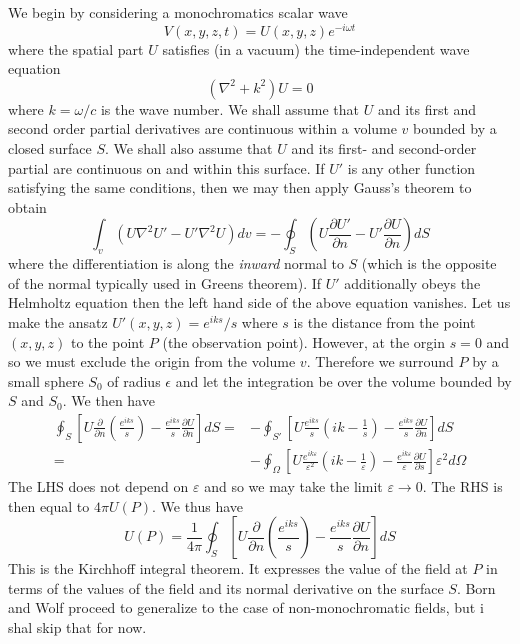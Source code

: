\documentclass[../../main.tex]{subfiles} %
\begin{document}
We begin by considering a monochromatics scalar wave 
\begin{equation}
    V(x,y,z,t)=U(x,y,z)e^{-i\omega t}
\end{equation}
where the spatial part $U$ satisfies (in a vacuum) the time-independent wave equation
\begin{equation}\label{eq. Helmholtz equation}
    (\nabla^2+k^2)U=0
\end{equation}
where $k=\omega/c$ is the wave number. We shall assume that $U$ and its first and second order partial derivatives are continuous within a volume $v$ bounded by a closed surface $S$. We shall also assume that $U$ and its first- and second-order partial are continuous on and within this surface. If $U'$ is any other function satisfying the same conditions, then we may then apply Gauss's theorem to obtain 
\begin{equation}
    \int_v (U\nabla^2U'-U'\nabla^2U)dv=-\oint_S \left(U\frac{\partial U'}{\partial n} -U'\frac{\partial U}{\partial n}\right)dS
\end{equation}
where the differentiation is along the \textit{inward} normal to $S$ (which is the opposite of the normal typically used in Greens theorem). If $U'$ additionally obeys the Helmholtz equation then the left hand side of the above equation vanishes. Let us make the ansatz $U'(x,y,z)=e^{iks}/s$ where $s$ is the distance from the point $(x,y,z)$ to the point $P$ (the observation point). However, at the orgin $s=0$ and so we must exclude the origin from the volume $v$. Therefore we surround $P$ by a small sphere $S_0$ of radius $\epsilon$ and let the integration be over the volume bounded by $S$ and $S_0$. We then have
\begin{equation}
    \begin{aligned}
    \oint_S\left[U\frac{\partial}{\partial n}\left(\frac{e^{iks}}{s}\right)-\frac{e^{iks}}{s}\frac{\partial U}{\partial n}\right]dS=&-\oint_{S'}\left[U\frac{e^{iks}}{{s}}\left(ik-\frac{1}{s}\right)-\frac{e^{iks}}{s}\frac{\partial U}{\partial n}\right]dS\\
    =&-\oint_{\Omega}\left[U\frac{e^{ik\varepsilon}}{\varepsilon^2}\left(ik-\frac{1}{\varepsilon}\right)-\frac{e^{ik\varepsilon}}{\varepsilon}\frac{\partial U}{\partial s}\right]\varepsilon^2d\Omega
    \end{aligned}
\end{equation}
The LHS does not depend on $\varepsilon$ and so we may take the limit $\varepsilon\to0$. The RHS is then equal to $4\pi U(P)$. We thus have
\begin{equation} \label{eq. Kirchhoff integral theorem}
    U(P)=\frac{1}{4\pi}\oint_S\left[U\frac{\partial}{\partial n}\left(\frac{e^{iks}}{s}\right)-\frac{e^{iks}}{s}\frac{\partial U}{\partial n}\right]dS
\end{equation}
This is the Kirchhoff integral theorem. It expresses the value of the field at $P$ in terms of the values of the field and its normal derivative on the surface $S$. Born and Wolf proceed to generalize to the case of non-monochromatic fields, but i shal skip that for now.
\end{document}
